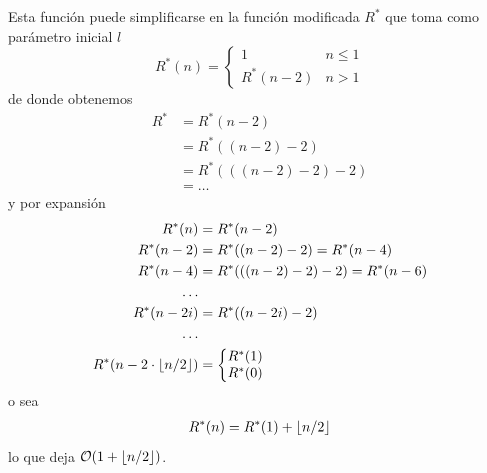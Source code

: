 \documentclass[paper=leter, fontsize=11pt]{scrartcl}
\numberwithin{equation}{section}		%
\numberwithin{figure}{section}			%
\numberwithin{table}{section}				%
\DeclarePairedDelimiter\floor{\lfloor}{\rfloor}
\begin{document}
Esta función puede simplificarse en la función modificada $R^*$ que toma como parámetro inicial $l$
\begin{equation}
    R^*(n) = \left\{\begin{matrix}
        1 & n \leq 1\\ 
        R^*(n - 2) & n > 1
        \end{matrix}\right.
\end{equation}
de donde obtenemos
\begin{equation}
    \begin{split}
    R^* & = R^*(n - 2) \\ 
    & = R^*((n - 2) - 2) \\
    & = R^*(((n - 2) - 2) - 2) \\
    & = \ldots
    \end{split}
\end{equation}
y por expansión
\begin{equation}
    \begin{split}
    R^*(n) & = R^*(n - 2) \\
    R^*(n - 2) & = R^*((n - 2) - 2) = R^*(n - 4)\\
    R^*(n - 4) & = R^*(((n - 2) - 2) - 2) = R^*(n - 6) \\
    \ldots \\
    R^*(n - 2i) & = R^*((n - 2i) - 2) \\
    \ldots \\
    R^*(n - 2 \cdot \floor*{n / 2}) & = \left\{\begin{matrix}
        R^*(1) \\ 
        R^*(0)
        \end{matrix}\right.
    \end{split}
\end{equation}
o sea
\begin{equation}
\begin{split}
    R^*(n) & = R^*(1) + \floor*{n / 2}\\
\end{split}
\end{equation}
lo que deja $\mathcal{O}(1 + \floor*{n / 2})$.



\end{document}
